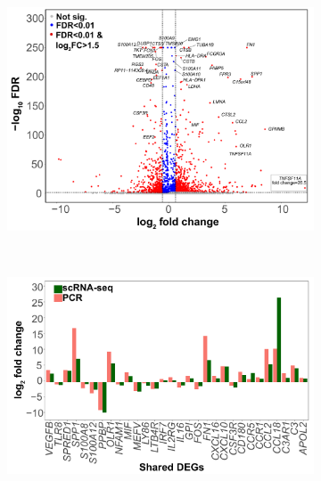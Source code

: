 \begin{figure}[htbp]
\centering
\begin{subfigure}[b]{0.60\textwidth}
\centering 
\includegraphics[width=\textwidth]{./Appendix/pdfs/Chapter5/PSA_monocytes_scanpy_single_cell_SFvsPB_volcano_plot_differential_analysis_less_labels}
\caption{}
\end{subfigure}
~
\begin{subfigure}[b]{0.50\textwidth}
\centering 
\includegraphics[width=\textwidth]{./Appendix/pdfs/Chapter5/PSA_monocytes_scanpy_single_cell_SFvsPB_PCR_correlation_fc_filtered}
\caption{}
\end{subfigure}%
~
\begin{subfigure}[b]{0.50\textwidth} 
\centering

\end{subfigure}
\end{figure}
